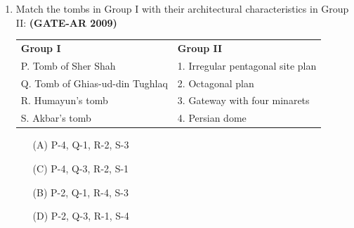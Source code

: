 \documentclass[a4paper,10pt]{article}
\begin{document}
\begin{enumerate}
    \item Match the tombs in Group I with their architectural characteristics in Group II: \hfill \textbf{(GATE-AR 2009)} \\
    \begin{tabular}{ p{\dimexpr\columnwidth-2\tabcolsep} p{\dimexpr\columnwidth-2\tabcolsep} }
	\textbf{Group I} & \textbf{Group II} \\
	P. Tomb of Sher Shah & 1. Irregular pentagonal site plan \\
	Q. Tomb of Ghias-ud-din Tughlaq & 2. Octagonal plan \\
	R. Humayun’s tomb & 3. Gateway with four minarets \\
	S. Akbar’s tomb & 4. Persian dome \\
	\end{tabular}
	\begin{multicols}{2}
	\begin{itemize}
        \item[(A)] P-4, Q-1, R-2, S-3
        \item[(C)] P-4, Q-3, R-2, S-1
        \item[(B)] P-2, Q-1, R-4, S-3
        \item[(D)] P-2, Q-3, R-1, S-4
    \end{itemize}
	\end{multicols}


\end{enumerate}
\end{document}
